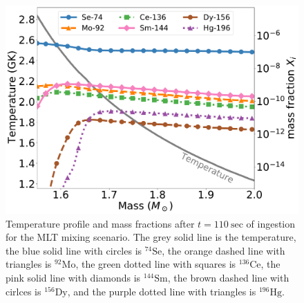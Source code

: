 \begin{figure}[!htbp]
\includegraphics[width=\textwidth]{chapters/2/figures/Temperature_Profile_with_X.pdf}
\caption{Temperature profile and mass fractions after $t=110~\mathrm{sec}$ of ingestion for the MLT mixing scenario. The grey solid line is the temperature, the blue solid line with circles is $^{74}\mathrm{Se}$, the orange dashed line with triangles is $^{92}\mathrm{Mo}$, the green dotted line with squares is $^{136}\mathrm{Ce}$, the pink solid line with diamonds is $^{144}\mathrm{Sm}$, the brown dashed line with cirlces is $^{156}\mathrm{Dy}$, and the purple dotted line with triangles is $^{196}\mathrm{Hg}$.
\label{fig:temperatureprofile}}
\end{figure}

